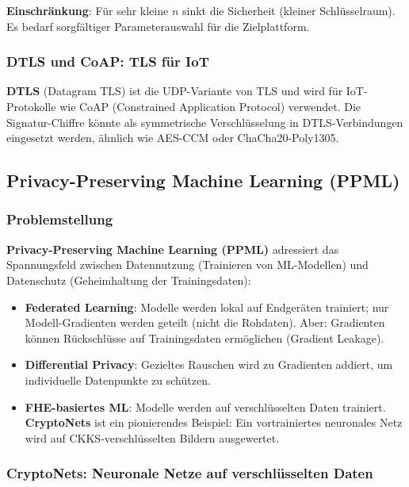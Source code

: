 ﻿\documentclass[a4paper,12pt]{scrreprt}
\theoremstyle{definition}
\begin{document}
\textbf{Einschränkung}: Für sehr kleine $n$ sinkt die Sicherheit (kleiner Schlüsselraum). Es bedarf sorgfältiger Parameterauswahl für die Zielplattform.

\subsubsection{DTLS und CoAP: TLS für IoT}

\textbf{DTLS} (Datagram TLS) ist die UDP-Variante von TLS und wird für IoT-Protokolle wie CoAP (Constrained Application Protocol) verwendet. Die Signatur-Chiffre könnte als symmetrische Verschlüsselung in DTLS-Verbindungen eingesetzt werden, ähnlich wie AES-CCM oder ChaCha20-Poly1305.

\subsection{Privacy-Preserving Machine Learning (PPML)}

\subsubsection{Problemstellung}

\textbf{Privacy-Preserving Machine Learning (PPML)} adressiert das Spannungsfeld zwischen Datennutzung (Trainieren von ML-Modellen) und Datenschutz (Geheimhaltung der Trainingsdaten):

\begin{itemize}
    \item \textbf{Federated Learning}: Modelle werden lokal auf Endgeräten trainiert; nur Modell-Gradienten werden geteilt (nicht die Rohdaten). Aber: Gradienten können Rückschlüsse auf Trainingsdaten ermöglichen (Gradient Leakage).
    \item \textbf{Differential Privacy}: Gezieltes Rauschen wird zu Gradienten addiert, um individuelle Datenpunkte zu schützen.
    \item \textbf{FHE-basiertes ML}: Modelle werden auf verschlüsselten Daten trainiert. \textbf{CryptoNets} \cite{GLP+21} ist ein pionierendes Beispiel: Ein vortrainiertes neuronales Netz wird auf CKKS-verschlüsselten Bildern ausgewertet.
\end{itemize}

\subsubsection{CryptoNets: Neuronale Netze auf verschlüsselten Daten}
\end{document}
